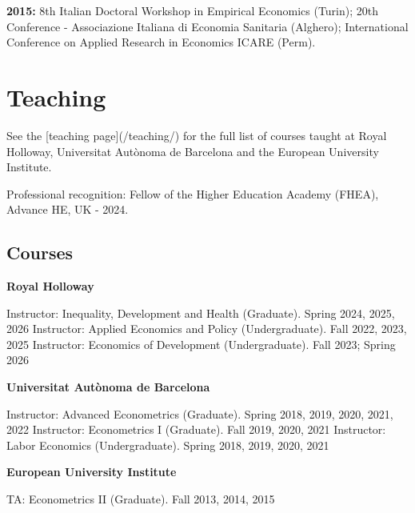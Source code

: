 \documentclass[letterpaper]{article}
\renewenvironment{itemize}{
  \begin{list}{}{
    \setlength{\leftmargin}{1.5em}
  }
}{
  \end{list}
}
\newcommand{\cvbullet}[1]{\item #1}
\newcommand{\cvyear}[2]{\item {\bf #1:} #2}
\begin{document}
\begin{itemize}
	\cvyear{2015}{8th Italian Doctoral Workshop in Empirical Economics (Turin); 20th Conference - Associazione Italiana di Economia Sanitaria (Alghero); International Conference on Applied Research in Economics ICARE (Perm).}
\end{itemize}

\section*{Teaching}
\begin{itemize}
	\cvbullet{See the [teaching page](/teaching/) for the full list of courses taught at Royal Holloway, Universitat Aut\`{o}noma de Barcelona and the European University Institute.}
	\cvbullet{Professional recognition: Fellow of the Higher Education Academy (FHEA), Advance HE, UK - 2024.}
\end{itemize}

\subsection*{Courses}
\begin{itemize}
	\item {\bf Royal Holloway}

	\leftskip 0.25in
	\parindent -0.5in
	\subitem Instructor: Inequality, Development and Health (Graduate). Spring 2024, 2025, 2026
	\subitem Instructor: Applied Economics and Policy (Undergraduate). Fall 2022, 2023, 2025
	\subitem Instructor: Economics of Development (Undergraduate). Fall 2023; Spring 2026\\

	\leftskip 0in
	\item {\bf Universitat Aut\`{o}noma de Barcelona}

	\leftskip 0.25in
	\parindent -0.5in
	\subitem Instructor: Advanced Econometrics (Graduate). Spring 2018, 2019, 2020, 2021, 2022
	\subitem Instructor: Econometrics I (Graduate). Fall 2019, 2020, 2021
	\subitem Instructor: Labor Economics (Undergraduate). Spring 2018, 2019, 2020, 2021 \\

	\leftskip 0in
	\item {\bf European University Institute}

	\leftskip 0.25in
	\parindent -0.5in
	\subitem TA: Econometrics II (Graduate). Fall 2013, 2014, 2015
\end{itemize}
\end{document}
